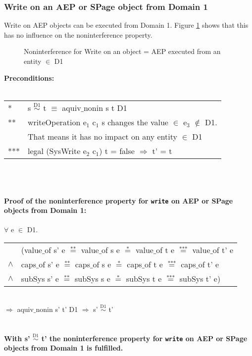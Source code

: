 \subsubsection{Write on an AEP or SPage object from Domain 1}\label{WriteOut2}
Write on AEP objects can be executed from Domain 1. Figure \ref{fig:WriteOut2} shows that this has no influence on the noninterference property.
\begin{flushleft}
\begin{figure}[H]
\caption{Noninterference for Write on an object = AEP executed from an entity $\in$ D1}
\label{fig:WriteOut2}
\end{figure}
\end{flushleft}
\textbf{Preconditions:} \\ \\
\begin{tabular}{ll}
* & s $\overset{\text{D1}}{\sim}$ t $\equiv$ aquiv$\_$nonin s t D1	\\ 
** & writeOperation e$_1$ c$_1$ s changes the value $\in$ e$_3$ $\notin$ D1. \\
& That means it has no impact on any entity $\in$ D1 \\ 
*** & legal (SysWrite e$_2$ c$_1$) t = false $\Rightarrow$ t' = t
\end{tabular} \\ \\ \\
\textbf{Proof of the noninterference property for \texttt{write} on AEP or SPage objects from Domain 1:}\\ \\
$\forall$ e $\in$ D1. \\
\begin{tabular}{ll}
& (value$\_$of s' e $\overset{\text{**}}{=}$ value$\_$of s e $\overset{\text{*}}{=}$ value$\_$of t e $\overset{\text{***}}{=}$ value$\_$of t' e \\
$\wedge$ & caps$\_$of s' e $\overset{\text{**}}{=}$ caps$\_$of s e $\overset{\text{*}}{=}$ caps$\_$of t e $\overset{\text{***}}{=}$ caps$\_$of t' e \\
$\wedge$ & subSys s' e $\overset{\text{**}}{=}$ subSys s e $\overset{\text{*}}{=}$ subSys t e $\overset{\text{***}}{=}$ subSys t' e)
\end{tabular} \\
$\Rightarrow$ aquiv$\_$nonin s' t' D1 $\Rightarrow$ s' $\overset{\text{D1}}{\sim}$ t'\\ \\ \\
\textbf{With s' $\overset{\text{D1}}{\sim}$ t' the noninterference property for \texttt{write} on AEP or SPage objects from Domain 1 is fulfilled.} 